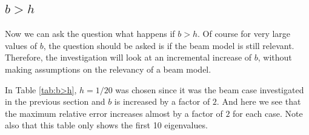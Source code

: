 \documentclass[../../main.tex]{subfiles}
\begin{document}
\subsection{$b > h$}
Now we can ask the question what happens if $b > h$. Of course for very large values of $b$, the question should be asked is if the beam model is still relevant. Therefore, the investigation will look at an incremental increase of $b$, without making assumptions on the relevancy of a beam model.\\

\FloatBarrier
\begin{table}[htbp]
\end{table}
\FloatBarrier
In Table \ref{tab:b>h}, $h = 1/20$ was chosen since it was the beam case investigated in the previous section and $b$ is increased by a factor of $2$. And here we see that the maximum relative error increases almost by a factor of $2$ for each case. Note also that this table only shows the first 10 eigenvalues.\\
\end{document}
